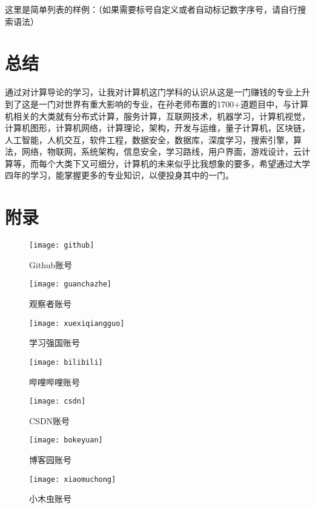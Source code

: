 \documentclass{article}
\begin{document}
这里是简单列表的样例：（如果需要标号自定义或者自动标记数字序号，请自行搜索语法）


\section{总结}
通过对计算导论的学习，让我对计算机这门学科的认识从这是一门赚钱的专业上升到了这是一门对世界有重大影响的专业，在孙老师布置的1700+道题目中，与计算机相关的大类就有分布式计算，服务计算，互联网技术，机器学习，计算机视觉，计算机图形，计算机网络，计算理论，架构，开发与运维，量子计算机，区块链，人工智能，人机交互，软件工程，数据安全，数据库，深度学习，搜索引擎，算法，网络，物联网，系统架构，信息安全，学习路线，用户界面，游戏设计，云计算等，而每个大类下又可细分，计算机的未来似乎比我想象的要多，希望通过大学四年的学习，能掌握更多的专业知识，以便投身其中的一门。\par


\section{附录}


    \begin{figure}[h!]
    	\centering
    	\texttt{[image: github]}
    	\caption{Github账号}
    \end{figure}
 

    \begin{figure}[h!]
    	\centering
    	\texttt{[image: guanchazhe]}
    	\caption{观察者账号}
    \end{figure}
\begin{figure}[h!]
	\centering
	\texttt{[image: xuexiqiangguo]}
	\caption{学习强国账号}
\end{figure}
\begin{figure}[h!]
	\centering
	\texttt{[image: bilibili]}
	\caption{哔哩哔哩账号}
\end{figure}


    \begin{figure}[h!]
    	\centering
    	\texttt{[image: csdn]}
    	\caption{CSDN账号}
    \end{figure}
\begin{figure}[h!]
	\centering
	\texttt{[image: bokeyuan]}
	\caption{博客园账号}
\end{figure}


    \begin{figure}[h!]
    	\centering
    	\texttt{[image: xiaomuchong]}
    	\caption{小木虫账号}
    \end{figure}
\end{document}
